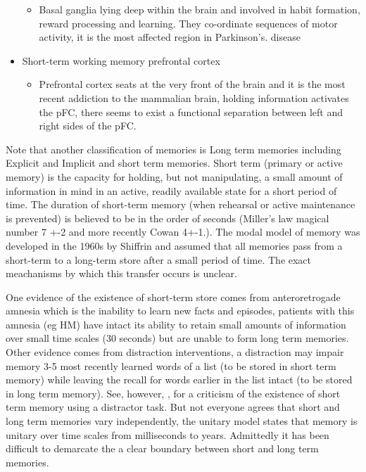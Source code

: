 \documentclass[9pt,twocolumn,twoside]{pnas-new}
\begin{document}
\begin{itemize}
\begin{itemize}
		\item Basal ganglia lying deep within the brain and involved in habit formation, reward processing and learning. They co-ordinate sequences of motor activity, it is the most affected region in Parkinson's. disease
	\end{itemize}
\item Short-term working memory prefrontal cortex
	\begin{itemize}
		\item Prefrontal cortex seats at the very front of the brain and it is the most recent addiction to the mammalian brain, holding information activates the pFC, there seems to exist a functional separation between left and right sides of the pFC.
	\end{itemize}  
\end{itemize}

Note that another classification of memories is Long term memories including Explicit and Implicit and short term memories. Short term (primary or active memory) is the capacity for holding, but not manipulating, a small amount of information in mind in an active, readily available state for a short period of time.  The duration of short-term memory (when rehearsal or active maintenance is prevented) is believed to be in the order of seconds (Miller's law magical number 7 +-2 and more recently Cowan 4+-1.).
The modal model of memory was developed in the 1960s by Shiffrin and assumed that all memories pass from a short-term to a long-term store after a small period of time. The exact meachanisms by which this transfer occurs is unclear.

One evidence of the existence of short-term store comes from anteroretrogade amnesia which is the inability to learn new facts and episodes, patients with this amnesia (eg HM) have intact its ability to retain small amounts of information over small time scales (30 seconds) but are unable to form long term memories. Other evidence comes from distraction interventions, a distraction may impair memory 3-5 most recently learned words of a list (to be stored in short  term memory) while leaving the recall for words earlier in the list intact (to be stored in long term memory). See, however, \cite{bjork1974recency}, for a criticism of the existence of short term memory using a distractor task. But not everyone agrees that short and long term memories vary independently, the unitary model states that memory is unitary over time scales from milliseconds to years. Admittedly it has been difficult to demarcate the a clear boundary between short and long term memories.
\end{document}
